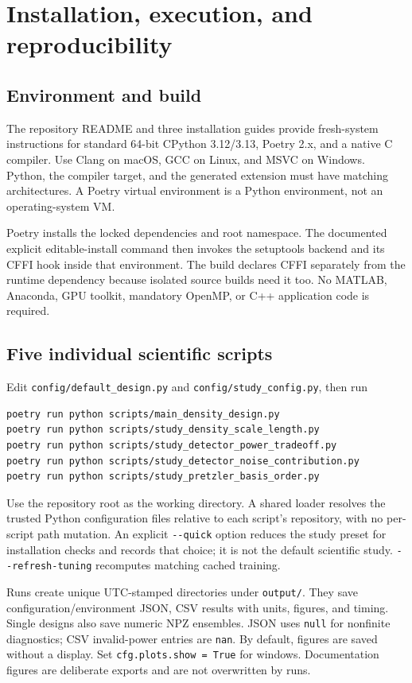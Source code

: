 \documentclass[11pt,letterpaper]{article}
\newcommand{\code}[1]{\nolinkurl{#1}}
\begin{document}
\section{Installation, execution, and reproducibility}
\subsection{Environment and build}
The repository README and three installation guides provide fresh-system
instructions for standard 64-bit CPython 3.12/3.13, Poetry 2.x, and a native C
compiler. Use Clang on macOS, GCC on Linux, and MSVC on Windows. Python, the
compiler target, and the generated extension must have matching architectures.
A Poetry virtual environment is a Python environment, not an operating-system VM.

Poetry installs the locked dependencies and root namespace. The documented
explicit editable-install command then invokes the setuptools backend and its
CFFI hook inside that environment. The build declares CFFI separately from the
runtime dependency because isolated source builds need it too. No MATLAB,
Anaconda, GPU toolkit, mandatory OpenMP, or C++ application code is required.

\subsection{Five individual scientific scripts}
Edit \code{config/default_design.py} and \code{config/study_config.py}, then run
\begin{verbatim}
poetry run python scripts/main_density_design.py
poetry run python scripts/study_density_scale_length.py
poetry run python scripts/study_detector_power_tradeoff.py
poetry run python scripts/study_detector_noise_contribution.py
poetry run python scripts/study_pretzler_basis_order.py
\end{verbatim}
Use the repository root as the working directory. A shared loader resolves the
trusted Python configuration files relative to each script's repository, with
no per-script path mutation. An explicit \code{--quick} option reduces the study
preset for installation checks and records that choice; it is not the default
scientific study. \code{--refresh-tuning} recomputes matching cached training.

Runs create unique UTC-stamped directories under \code{output/}. They save
configuration/environment JSON, CSV results with units, figures, and timing.
Single designs also save numeric NPZ ensembles. JSON uses \code{null} for
nonfinite diagnostics; CSV invalid-power entries are \code{nan}. By default,
figures are saved without a display. Set \code{cfg.plots.show = True} for windows.
Documentation figures are deliberate exports and are not overwritten by runs.
\end{document}
